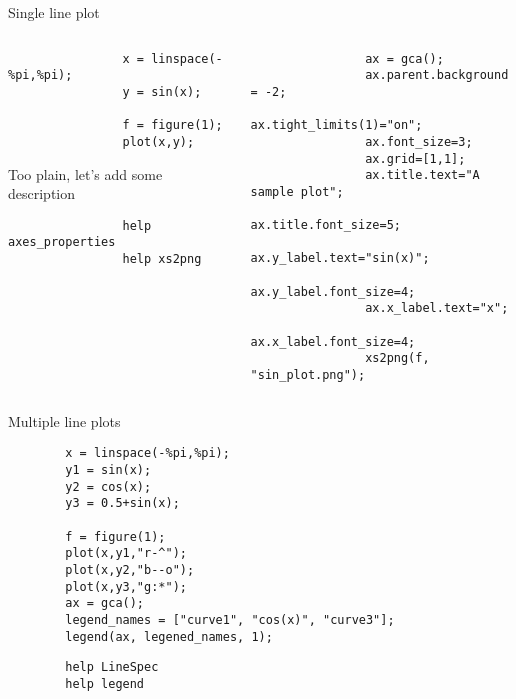 \begin{frame}[fragile]{Single line plot}
    \begin{columns}
        \begin{column}{0.5\linewidth}
            \begin{lstlisting}
                x = linspace(-%pi,%pi);
                y = sin(x);
                
                f = figure(1);
                plot(x,y);
            \end{lstlisting}
            \vspace{1em}
            Too plain, let's add some description
            \begin{lstlisting}
                help axes_properties
                help xs2png
            \end{lstlisting}
        \end{column}
        \begin{column}{0.5\linewidth}
            \begin{lstlisting}
                ax = gca();
                ax.parent.background = -2;
                ax.tight_limits(1)="on";
                ax.font_size=3;
                ax.grid=[1,1];
                ax.title.text="A sample plot";
                ax.title.font_size=5;
                ax.y_label.text="sin(x)";
                ax.y_label.font_size=4;
                ax.x_label.text="x";
                ax.x_label.font_size=4;
                xs2png(f, "sin_plot.png");
            \end{lstlisting}
        \end{column}
    \end{columns}
\end{frame}

\begin{frame}[fragile]{Multiple line plots}
    \begin{lstlisting}
        x = linspace(-%pi,%pi);
        y1 = sin(x);
        y2 = cos(x);
        y3 = 0.5+sin(x);
        
        f = figure(1);
        plot(x,y1,"r-^");
        plot(x,y2,"b--o");
        plot(x,y3,"g:*");
        ax = gca();
        legend_names = ["curve1", "cos(x)", "curve3"];
        legend(ax, legened_names, 1);
    \end{lstlisting}
    \begin{lstlisting}
        help LineSpec
        help legend
    \end{lstlisting}
\end{frame}

